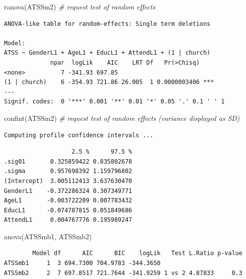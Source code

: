 \documentclass[
  11pt,
]{book}
\newenvironment{Shaded}{\begin{snugshade}}{\end{snugshade}}
\newcommand{\CommentTok}[1]{\textcolor[rgb]{0.56,0.35,0.01}{\textit{#1}}}
\newcommand{\FunctionTok}[1]{\textcolor[rgb]{0.00,0.00,0.00}{#1}}
\newcommand{\NormalTok}[1]{#1}
\begin{document}
\begin{Shaded}
\begin{Highlighting}[]
\FunctionTok{ranova}\NormalTok{(ATSSm2) }\CommentTok{\# request test of random effects}
\end{Highlighting}
\end{Shaded}

\begin{verbatim}
ANOVA-like table for random-effects: Single term deletions

Model:
ATSS ~ GenderL1 + AgeL1 + EducL1 + AttendL1 + (1 | church)
             npar  logLik    AIC    LRT Df   Pr(>Chisq)    
<none>          7 -341.93 697.85                           
(1 | church)    6 -354.93 721.86 26.005  1 0.0000003406 ***
---
Signif. codes:  0 '***' 0.001 '**' 0.01 '*' 0.05 '.' 0.1 ' ' 1
\end{verbatim}

\begin{Shaded}
\begin{Highlighting}[]
\FunctionTok{confint}\NormalTok{(ATSSm2) }\CommentTok{\# request test of random effects (variance displayed as SD)}
\end{Highlighting}
\end{Shaded}

\begin{verbatim}
Computing profile confidence intervals ...
\end{verbatim}

\begin{verbatim}
                   2.5 %      97.5 %
.sig01       0.325859422 0.835802678
.sigma       0.957698392 1.159796802
(Intercept)  3.005112413 3.637630470
GenderL1    -0.372286324 0.307349771
AgeL1       -0.003722209 0.007783432
EducL1      -0.074787815 0.051849686
AttendL1     0.004767776 0.195989247
\end{verbatim}

\begin{Shaded}
\begin{Highlighting}[]
\FunctionTok{anova}\NormalTok{(ATSSmb1, ATSSmb2) }
\end{Highlighting}
\end{Shaded}

\begin{verbatim}
        Model df      AIC      BIC    logLik   Test L.Ratio p-value
ATSSmb1     1  3 694.7300 704.9783 -344.3650                       
ATSSmb2     2  7 697.8517 721.7644 -341.9259 1 vs 2 4.87833     0.3
\end{verbatim}
\end{document}
